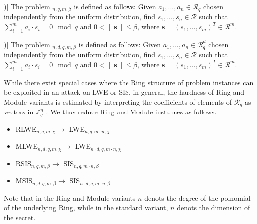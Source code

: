 \documentclass[
  a4paper,  %
  twoside,  %
  bibliography=totoc,
  headsepline,
  cleardoublepage=empty,
  parskip=half,
  draft=false
]{scrbook}
\begin{document}
\begin{definition}[Ring-SIS Problem [\citealp{LS15}, Definition 3.3])]
  The problem $_{n, q, m, \beta}$ is defined as follows: Given $a_1, ..., a_n \in \mathcal{R}_q$ chosen independently from the uniform distribution, find $s_1, ..., s_n \in \mathcal{R}$ such that $\sum_{i=1}^m a_i \cdot s_i = 0 \mod q$ and $0 < \| \textbf{s}\| \leq \beta$, where $\textbf{s} = (s_1, ..., s_m)^T \in \mathcal{R}^m$.
\end{definition} %

\begin{definition}[Module-SIS Problem [\citealp{LS15}, Definition 3.3])]
  The problem $_{n, d, q, m, \beta}$ is defined as follows: Given $a_1, ..., a_n \in \mathcal{R}_q^d$ chosen independently from the uniform distribution, find $s_1, ..., s_n \in \mathcal{R}$ such that $\sum_{i=1}^m a_i \cdot s_i = 0\mod q$ and $0 < \| \textbf{s}\| \leq \beta$, where $\textbf{s} = (s_1, ..., s_m)^T \in \mathcal{R}^m$.
\end{definition} %


While there exist special cases where the Ring structure of problem instances can be exploited in an attack on LWE or SIS, %
in general, the hardness of Ring and Module variants is estimated by interpreting the coefficients of elements of $\mathcal{R}_q$ as vectors in $\mathbb{Z}_q^n$ \cite{ACDDPPVW18}.
We thus reduce Ring and Module instances as follows:
\begin{itemize}
  \item RLWE$_{n, q, m, \chi} \longrightarrow$ LWE$_{n, q, m \cdot n, \chi}$
  \item MLWE$_{n, d, q, m, \chi} \longrightarrow$ LWE$_{n \cdot d, q, m \cdot n, \chi}$
  \item RSIS$_{n, q, m, \beta} \longrightarrow$ SIS$_{n, q, m \cdot n, \beta}$
  \item MSIS$_{n, d, q, m, \beta} \longrightarrow$ SIS$_{n \cdot d, q, m \cdot n, \beta}$
\end{itemize}
Note that in the Ring and Module variants $n$ denots the degree of the polnomial of the underlying Ring, %
while in the standard variant, $n$ denots the dimension of the secret. 
  
  
\end{document}
